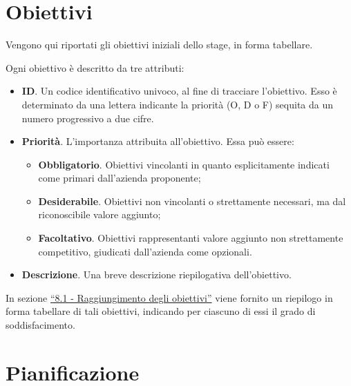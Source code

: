 \section{Obiettivi}

Vengono qui riportati gli obiettivi iniziali dello stage, in forma tabellare.

Ogni obiettivo è descritto da tre attributi:

\begin{itemize}
    \item \textbf{ID}. Un codice identificativo univoco, al fine di tracciare l'obiettivo. Esso è determinato da una lettera indicante la priorità (O, D o F) sequita da un numero progressivo a due cifre.
    \item \textbf{Priorità}. L'importanza attribuita all'obiettivo. Essa può essere:
    \begin{itemize}
        \item \textbf{Obbligatorio}. Obiettivi vincolanti in quanto esplicitamente indicati come primari dall'azienda proponente; 
        \item \textbf{Desiderabile}. Obiettivi non vincolanti o strettamente necessari, ma dal riconoscibile valore
        aggiunto;
        \item \textbf{Facoltativo}. Obiettivi rappresentanti valore aggiunto non strettamente competitivo, giudicati dall'azienda come opzionali.
    \end{itemize} 
    \item \textbf{Descrizione}. Una breve descrizione riepilogativa dell'obiettivo. 
\end{itemize}



In sezione {\hyperref[sec:obiettivi-raggiunti]{``8.1 - Raggiungimento degli obiettivi''}} viene fornito un riepilogo in forma tabellare di tali obiettivi, indicando per ciascuno di essi il grado di soddisfacimento.

\section{Pianificazione}



